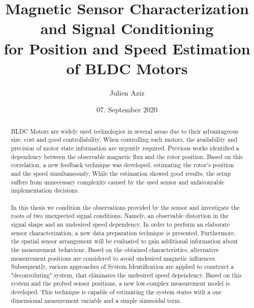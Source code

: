 \documentclass[english]{isasthesis}
\title{Magnetic Sensor Characterization and Signal Conditioning\\ for Position and Speed Estimation\\ of BLDC Motors}
\author{Julien Aziz}
\date{07. September 2020}
\begin{document}
    \maketitle
    \begin{abstract}
        BLDC Motors are widely used technologies in several areas due to their advantageous size, cost and good controllability. When controlling such motors, the availability and precision of motor state information are urgently required. Previous works identified a dependency between the observable magnetic flux and the rotor position. Based on this correlation, a new feedback technique was developed, estimating the rotor's position and the speed simultaneously. While the estimation showed good results, the setup suffers from unnecessary complexity caused by the used sensor and unfavourable implementation decisions. \\ \\
In this thesis we condition the observations provided by the sensor and investigate the roots of two unexpected signal conditions. Namely, an observable distortion in the signal shape and an undesired speed dependency. In order to perform an elaborate sensor characterization, a new data preparation technique is presented. Furthermore, the spatial sensor arrangement will be evaluated to gain additional information about the measurement behaviour. Based on the obtained characteristics, alternative measurement positions are considered to avoid undesired magnetic influences. Subsequently, various approaches of System Identification are applied to construct a "deconvoluting" system, that eliminates the undesired speed dependency. Based on this system and the probed sensor positions, a new low-complex measurement model is developed. This technique is capable of estimating the system states with a one dimensional measurement variable and a simple sinusoidal term.  
    \end{abstract}
    \maketoc
    
\end{document}
